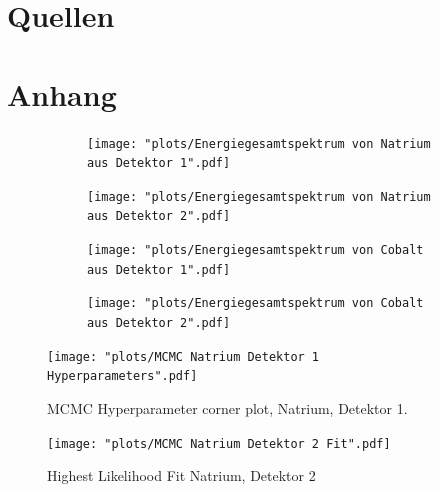 \documentclass[%
aps,
onecolumn,
11pt,
tightenlines,
nofootinbib,
superscriptaddress,
floatfix,
prd,
]{revtex4-2}
\begin{document}
\newpage

\section{Quellen}
\setlength{\bibsep}{6pt}




\section{Anhang}
\label{sec:Anhang}
\begin{figure}[ht]
	\label{fig:initialplotsSo}
	\begin{subfigure}[c]{0.8\textwidth}
		\texttt{[image: "plots/Energiegesamtspektrum von Natrium aus Detektor 1".pdf]}
	\end{subfigure}

	\begin{subfigure}[c]{0.8\textwidth}
		\texttt{[image: "plots/Energiegesamtspektrum von Natrium aus Detektor 2".pdf]}
	\end{subfigure}
\end{figure}

\begin{figure}[ht]
	\label{fig:initialplotsCo}
	\begin{subfigure}[c]{0.8\textwidth}
		\texttt{[image: "plots/Energiegesamtspektrum von Cobalt aus Detektor 1".pdf]}
	\end{subfigure}

	\begin{subfigure}[c]{0.8\textwidth}
		\texttt{[image: "plots/Energiegesamtspektrum von Cobalt aus Detektor 2".pdf]}
	\end{subfigure}

\end{figure}
\begin{figure}		
	\texttt{[image: "plots/MCMC Natrium Detektor 1 Hyperparameters".pdf]}
	\caption{MCMC Hyperparameter corner plot, Natrium, Detektor 1.}
	\label{fig:cornerplot}
\end{figure}

\begin{figure}
	\texttt{[image: "plots/MCMC Natrium Detektor 2 Fit".pdf]}
	\caption{Highest Likelihood Fit Natrium, Detektor 2}
	\label{fig:mcmcfitna2}
\end{figure}
\end{document}

